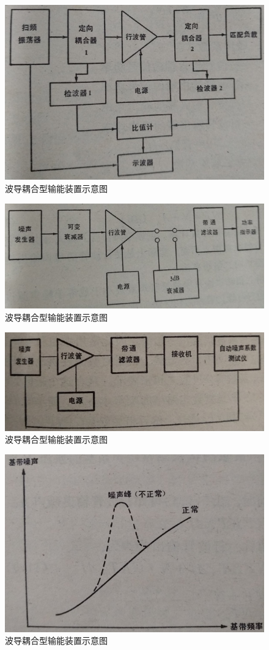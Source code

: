 \begin{figure}[phtb]
	\centering
	\includegraphics[width=0.75\linewidth]{figure/ch11-6}
	\caption{ 波导耦合型输能装置示意图}
	\label{ch11-6}
\end{figure}
\begin{figure}[phtb]
	\centering
	\includegraphics[width=0.75\linewidth]{figure/ch11-7}
	\caption{ 波导耦合型输能装置示意图}
	\label{ch11-7}
\end{figure}
\begin{figure}[phtb]
	\centering
	\includegraphics[width=0.75\linewidth]{figure/ch11-8}
	\caption{ 波导耦合型输能装置示意图}
	\label{ch11-8}
\end{figure}
\begin{figure}[phtb]
	\centering
	\includegraphics[width=0.75\linewidth]{figure/ch11-9}
	\caption{ 波导耦合型输能装置示意图}
	\label{ch11-9}
\end{figure}
